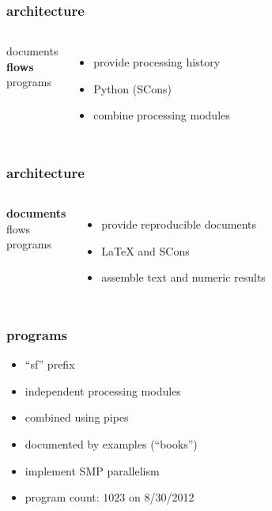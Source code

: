 \begin{frame} \frametitle{\mg architecture}

  \begin{columns}
    documents \\
    \vspace{0.25in}
    \textbf{flows} \\
    \vspace{0.25in}
    programs
    
    \begin{itemize}
    \item provide processing history
    \item Python (SCons)
    \item combine processing modules
    \end{itemize}
    
  \end{columns}
  
\end{frame}
\cwpnote{}

\begin{frame} \frametitle{\mg architecture}

  \begin{columns}
    \textbf{documents} \\
    \vspace{0.25in}
    flows \\
    \vspace{0.25in}
    programs
    
    \begin{itemize}
    \item provide reproducible documents
    \item \LaTeX\; and SCons
    \item assemble text and numeric results
    \end{itemize}
    
  \end{columns}
  
\end{frame}
\cwpnote{}


\begin{frame} \frametitle{programs}

  \begin{itemize}
  \item ``sf'' prefix
  \item independent processing modules
  \item combined using pipes
  \item documented by examples (``books'')
  \item implement SMP parallelism
  \item program count: $1023$ on 8/30/2012
  \end{itemize}
  
\end{frame}
\cwpnote{}

